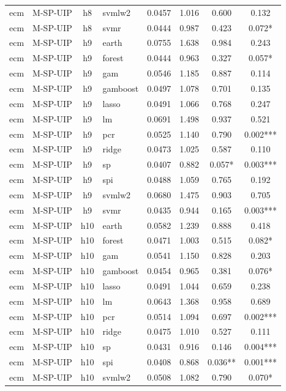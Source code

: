 \begin{ThreePartTable}
\begin{longtable}[t]{llclcccc}
ecm & M-SP-UIP & h8 & svmlw2 & 0.0457 & 1.016 & 0.600 & 0.132\\
ecm & M-SP-UIP & h8 & svmr & 0.0444 & 0.987 & 0.423 & 0.072*\\
\addlinespace
ecm & M-SP-UIP & h9 & earth & 0.0755 & 1.638 & 0.984 & 0.243\\
ecm & M-SP-UIP & h9 & forest & 0.0444 & 0.963 & 0.327 & 0.057*\\
ecm & M-SP-UIP & h9 & gam & 0.0546 & 1.185 & 0.887 & 0.114\\
ecm & M-SP-UIP & h9 & gamboost & 0.0497 & 1.078 & 0.701 & 0.135\\
ecm & M-SP-UIP & h9 & lasso & 0.0491 & 1.066 & 0.768 & 0.247\\
ecm & M-SP-UIP & h9 & lm & 0.0691 & 1.498 & 0.937 & 0.521\\
ecm & M-SP-UIP & h9 & pcr & 0.0525 & 1.140 & 0.790 & 0.002***\\
ecm & M-SP-UIP & h9 & ridge & 0.0473 & 1.025 & 0.587 & 0.110\\
ecm & M-SP-UIP & h9 & sp & 0.0407 & 0.882 & 0.057* & 0.003***\\
ecm & M-SP-UIP & h9 & spi & 0.0488 & 1.059 & 0.765 & 0.192\\
ecm & M-SP-UIP & h9 & svmlw2 & 0.0680 & 1.475 & 0.903 & 0.705\\
ecm & M-SP-UIP & h9 & svmr & 0.0435 & 0.944 & 0.165 & 0.003***\\
\addlinespace
ecm & M-SP-UIP & h10 & earth & 0.0582 & 1.239 & 0.888 & 0.418\\
ecm & M-SP-UIP & h10 & forest & 0.0471 & 1.003 & 0.515 & 0.082*\\
ecm & M-SP-UIP & h10 & gam & 0.0541 & 1.150 & 0.828 & 0.203\\
ecm & M-SP-UIP & h10 & gamboost & 0.0454 & 0.965 & 0.381 & 0.076*\\
ecm & M-SP-UIP & h10 & lasso & 0.0491 & 1.044 & 0.659 & 0.238\\
ecm & M-SP-UIP & h10 & lm & 0.0643 & 1.368 & 0.958 & 0.689\\
ecm & M-SP-UIP & h10 & pcr & 0.0514 & 1.094 & 0.697 & 0.002***\\
ecm & M-SP-UIP & h10 & ridge & 0.0475 & 1.010 & 0.527 & 0.111\\
ecm & M-SP-UIP & h10 & sp & 0.0431 & 0.916 & 0.146 & 0.004***\\
ecm & M-SP-UIP & h10 & spi & 0.0408 & 0.868 & 0.036** & 0.001***\\
ecm & M-SP-UIP & h10 & svmlw2 & 0.0508 & 1.082 & 0.790 & 0.070*\\

\end{longtable}
\end{ThreePartTable}
